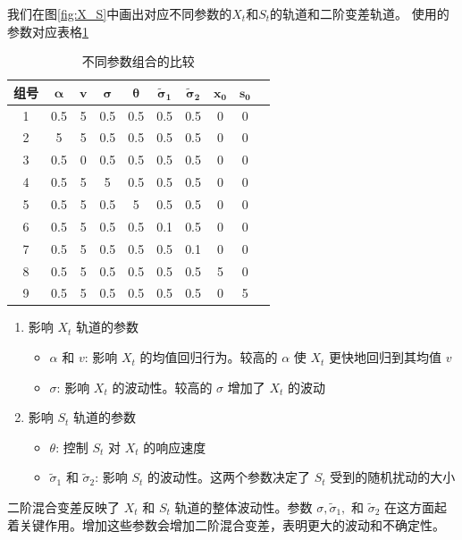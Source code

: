\documentclass[12pt,a4paper]{article}
\begin{document}
我们在图\ref{fig:X_S}中画出对应不同参数的$X_t$和$S_t$的轨道和二阶变差轨道。
使用的参数对应表格\ref{tab:parameter_sets1}
\begin{table}[h]
\centering
\begin{tabular}{|c|c|c|c|c|c|c|c|c|c|}
\hline
\textbf{组号} & $\boldsymbol{\alpha}$ & $\boldsymbol{v}$ & $\boldsymbol{\sigma}$ & $\boldsymbol{\theta}$ & $\boldsymbol{\tilde{\sigma}_1}$ & $\boldsymbol{\tilde{\sigma}_2}$ & $\boldsymbol{x_0}$ & $\boldsymbol{s_0}$ \\ 
\toprule
1 & 0.5 & 5   & 0.5 & 0.5 & 0.5 & 0.5 & 0 & 0 \\ \hline
2 & 5   & 5   & 0.5 & 0.5 & 0.5 & 0.5 & 0 & 0 \\ \hline
3 & 0.5 & 0   & 0.5 & 0.5 & 0.5 & 0.5 & 0 & 0 \\ \hline
4 & 0.5 & 5   & 5   & 0.5 & 0.5 & 0.5 & 0 & 0 \\ \hline
5 & 0.5 & 5   & 0.5 & 5   & 0.5 & 0.5 & 0 & 0 \\ \hline
6 & 0.5 & 5   & 0.5 & 0.5 & 0.1 & 0.5 & 0 & 0 \\ \hline
7 & 0.5 & 5   & 0.5 & 0.5 & 0.5 & 0.1 & 0 & 0 \\ \hline
8 & 0.5 & 5   & 0.5 & 0.5 & 0.5 & 0.5 & 5 & 0 \\ \hline
9 & 0.5 & 5   & 0.5 & 0.5 & 0.5 & 0.5 & 0 & 5 \\ 
\bottomrule
\end{tabular}
\caption{不同参数组合的比较}
\label{tab:parameter_sets1}
\end{table}

\begin{enumerate}
    \item 影响 \( X_t \) 轨道的参数
    \begin{itemize}
        \item \( \alpha \) 和 \( v \): 影响 \( X_t \) 的均值回归行为。较高的 \( \alpha \) 使 \( X_t \) 更快地回归到其均值 \( v \)
        \item \( \sigma \): 影响 \( X_t \) 的波动性。较高的 \( \sigma \) 增加了 \( X_t \) 的波动
    \end{itemize}
    \item 影响 \( S_t \) 轨道的参数
    \begin{itemize}
        \item \( \theta \): 控制 \( S_t \) 对 \( X_t \) 的响应速度
        \item \( \tilde{\sigma}_1 \) 和 \( \tilde{\sigma}_2 \): 影响 \( S_t \) 的波动性。这两个参数决定了 \( S_t \) 受到的随机扰动的大小
    \end{itemize}
    
\end{enumerate}
二阶混合变差反映了 \( X_t \) 和 \( S_t \) 轨道的整体波动性。参数 \( \sigma, \tilde{\sigma}_1, \) 和 \( \tilde{\sigma}_2 \) 在这方面起着关键作用。增加这些参数会增加二阶混合变差，表明更大的波动和不确定性。
\end{document}
